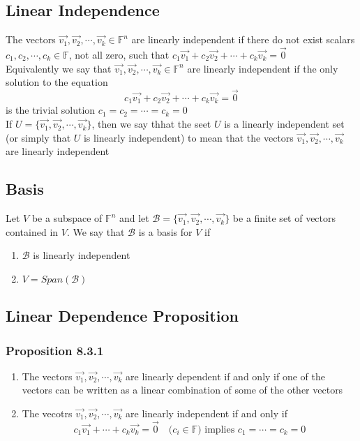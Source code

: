 \documentclass[12pt, letterpaper]{article}
\begin{document}
\subsection{Linear Independence}
The vectors $\vec{v_1}, \vec{v_2}, \cdots, \vec{v_k}\in\mathbb{F}^n$ are linearly independent if there do not exist scalars $c_1, c_2, \cdots, c_k\in\mathbb{F}$, not all zero, such that 
$c_1\vec{v_1}+c_2\vec{v_2}+\cdots+c_k\vec{v_k} = \vec{0}$\\
Equivalently we say that $\vec{v_1}, \vec{v_2}, \cdots, \vec{v_k}\in\mathbb{F}^n$ are linearly independent if the only solution to the equation 
\[c_1\vec{v_1} + c_2\vec{v_2} + \cdots + c_k\vec{v_k} = \vec{0}\]
is the trivial solution $c_1 = c_2 = \cdots = c_k = 0$\\
If $U=\{\vec{v_1}, \vec{v_2}, \cdots, \vec{v_k}\}$, then we say thhat the seet $U$ is a linearly independent set (or simply that $U$ is linearly independent) to mean that the vectors  
$\vec{v_1}, \vec{v_2}, \cdots, \vec{v_k}$ are linearly independent
\subsection{Basis}
Let $V$ be a subspace of $\mathbb{F}^n$ and let $\mathcal{B}=\{\vec{v_1}, \vec{v_2}, \cdots, \vec{v_k}\}$ be a finite set of vectors contained in $V$. We say 
that $\mathcal{B}$ is a basis for $V$ if 
\begin{enumerate}
    \item $\mathcal{B}$ is linearly independent 
    \item $V = Span(\mathcal{B})$
\end{enumerate}
\subsection{Linear Dependence Proposition}
\subsubsection{Proposition 8.3.1}
\begin{enumerate}
    \item The vectors $\vec{v_1}, \vec{v_2}, \cdots, \vec{v_k}$ are linearly dependent if and only if one of the vectors can be written as a linear combination of some of the other vectors 
    \item The vecotrs $\vec{v_1}, \vec{v_2}, \cdots, \vec{v_k}$ are linearly independent if and only if 
    \[c_1\vec{v_1} + \cdots + c_k\vec{v_k} = \vec{0}\quad\text{($c_i\in\mathbb{F}$) implies $c_1=\cdots=c_k=0$}\]
\end{enumerate}
\end{document}
